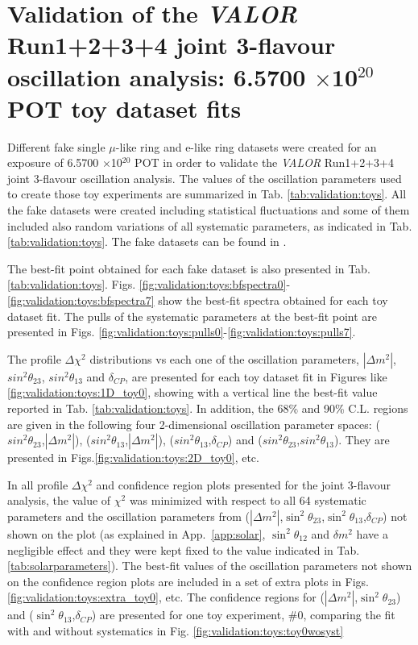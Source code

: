 \clearpage

\section {Validation of the \textit{VALOR} Run1+2+3+4 joint 3-flavour oscillation analysis: 6.5700 $\times$10$^{20}$ POT toy dataset fits}
\label{sec:fake_datasets}

Different fake single $\mu$-like ring and e-like ring datasets were created for an exposure of 6.5700 $\times$10$^{20}$ POT in order to validate the \textit{VALOR} Run1+2+3+4 joint 3-flavour oscillation analysis. The values of the oscillation parameters used to create those toy experiments are summarized in Tab. \ref{tab:validation:toys}. All the fake datasets were created including statistical fluctuations and some of them included also random variations of all systematic parameters, as indicated in Tab. \ref{tab:validation:toys}. The fake datasets can be found in \cite{toys}.

The best-fit point obtained for each fake dataset is also presented in Tab. \ref{tab:validation:toys}. Figs. \ref{fig:validation:toys:bfspectra0}-\ref{fig:validation:toys:bfspectra7} show the best-fit spectra obtained for each toy dataset fit. 
The pulls of the systematic parameters at the best-fit point are presented in Figs. \ref{fig:validation:toys:pulls0}-\ref{fig:validation:toys:pulls7}.

The profile $\Delta\chi^{2}$ distributions vs each one of the oscillation parameters, $|\Delta m^{2}|$, $sin^{2}\theta_{23}$,  $sin^{2}\theta_{13}$ and $\delta_{CP}$, are presented for each toy dataset fit in Figures like \ref{fig:validation:toys:1D_toy0}, showing with a vertical line the best-fit value reported in Tab. \ref{tab:validation:toys}. In addition, the 68\% and 90\% C.L. regions are given in the following four 2-dimensional oscillation parameter spaces: 
($sin^{2}\theta_{23}$,$|\Delta m^{2}|$), 
($sin^{2}\theta_{13}$,$|\Delta m^{2}|$), 
($sin^{2}\theta_{13}$,$\delta_{CP}$) and 
($sin^{2}\theta_{23}$,$sin^{2}\theta_{13}$).
They are presented in Figs.\ref{fig:validation:toys:2D_toy0}, etc.

In all profile $\Delta\chi^2$ and confidence region plots presented for the joint 3-flavour analysis,
the value of $\chi^2$ was minimized with respect to all 64 systematic parameters
and the oscillation parameters from ($|\Delta m^{2}|$,$\sin^{2}\theta_{23}$,$\sin^{2}\theta_{13}$,$\delta_{CP}$) not 
shown on the plot (as explained in App.\ \ref{app:solar}, $\sin^{2}\theta_{12}$ and $\delta m^{2}$ have a negligible effect and they were kept fixed to the value indicated in Tab. \ref{tab:solarparameters}). The best-fit values of the oscillation parameters not shown on the confidence region plots are included in a set of extra plots in Figs.\ref{fig:validation:toys:extra_toy0}, etc.
The confidence regions for ($|\Delta m^{2}|$,$\sin^{2}\theta_{23}$) and ($\sin^{2}\theta_{13}$,$\delta_{CP}$) are presented for one toy experiment, \#0, comparing the fit with and without systematics in Fig. \ref{fig:validation:toys:toy0wosyst}

